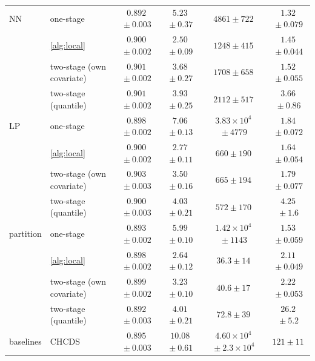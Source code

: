 \begin{table}[!t]
{\begin{tabular}{llcccc}
\addlinespace[2pt]
NN & one-stage & $0.892${\scriptsize${}\pm0.003$} & $5.23${\scriptsize${}\pm0.37$} & $4861${\scriptsize${}\pm722$} & $1.32${\scriptsize${}\pm0.079$}\\
 & \cref{alg:local} & $0.900${\scriptsize${}\pm0.002$} & $2.50${\scriptsize${}\pm0.09$} & $1248${\scriptsize${}\pm415$} & $1.45${\scriptsize${}\pm0.044$}\\
 & two-stage (own covariate) & $0.901${\scriptsize${}\pm0.002$} & $3.68${\scriptsize${}\pm0.27$} & $1708${\scriptsize${}\pm658$} & $1.52${\scriptsize${}\pm0.055$}\\
 & two-stage (quantile) & $0.901${\scriptsize${}\pm0.002$} & $3.93${\scriptsize${}\pm0.25$} & $2112${\scriptsize${}\pm517$} & $3.66${\scriptsize${}\pm0.86$}\\
\addlinespace[2pt]
LP & one-stage & $0.898${\scriptsize${}\pm0.002$} & $7.06${\scriptsize${}\pm0.13$} & $3.83\times10^{4}${\scriptsize${}\pm4779$} & $1.84${\scriptsize${}\pm0.072$}\\
 & \cref{alg:local} & $0.900${\scriptsize${}\pm0.002$} & $2.77${\scriptsize${}\pm0.11$} & $660${\scriptsize${}\pm190$} & $1.64${\scriptsize${}\pm0.054$}\\
 & two-stage (own covariate) & $0.903${\scriptsize${}\pm0.003$} & $3.50${\scriptsize${}\pm0.16$} & $665${\scriptsize${}\pm194$} & $1.79${\scriptsize${}\pm0.077$}\\
 & two-stage (quantile) & $0.900${\scriptsize${}\pm0.003$} & $4.03${\scriptsize${}\pm0.21$} & $572${\scriptsize${}\pm170$} & $4.25${\scriptsize${}\pm1.6$}\\
\addlinespace[2pt]
partition & one-stage & $0.893${\scriptsize${}\pm0.002$} & $5.99${\scriptsize${}\pm0.10$} & $1.42\times10^{4}${\scriptsize${}\pm1143$} & $1.53${\scriptsize${}\pm0.059$}\\
 & \cref{alg:local} & $0.898${\scriptsize${}\pm0.002$} & $2.64${\scriptsize${}\pm0.12$} & $36.3${\scriptsize${}\pm14$} & $2.11${\scriptsize${}\pm0.049$}\\
 & two-stage (own covariate) & $0.899${\scriptsize${}\pm0.002$} & $3.23${\scriptsize${}\pm0.10$} & $40.6${\scriptsize${}\pm17$} & $2.22${\scriptsize${}\pm0.053$}\\
 & two-stage (quantile) & $0.892${\scriptsize${}\pm0.003$} & $4.01${\scriptsize${}\pm0.21$} & $72.8${\scriptsize${}\pm39$} & $26.2${\scriptsize${}\pm5.2$}\\
\addlinespace[2pt]
baselines & CHCDS & $0.895${\scriptsize${}\pm0.003$} & $10.08${\scriptsize${}\pm0.61$} & $4.60\times10^{4}${\scriptsize${}\pm2.3\times10^{4}$} & $121${\scriptsize${}\pm11$}\\

\end{tabular}}
\end{table}

